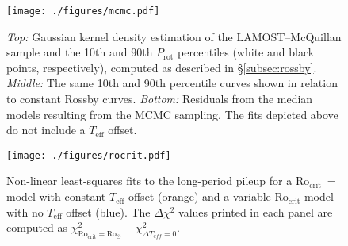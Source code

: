 \documentclass[trackchanges,twocolumn]{aastex631}
\newcommand{\rocrit}{$\mathrm{Ro_{crit}}$\xspace}
\newcommand{\rosun}{$\mathrm{Ro_{\odot}}$\xspace}
\newcommand{\lamostmcq}{LAMOST--McQuillan\xspace}
\newcommand{\teff}{\ensuremath{T_{\mathrm{eff}}}\xspace}
\newcommand{\prot}{\ensuremath{P_\mathrm{rot}}\xspace}
\begin{document}


\begin{figure}
    \centering
    \texttt{[image: ./figures/mcmc.pdf]}
    \caption{\textit{Top:} Gaussian kernel density estimation of the LAMOST--McQuillan sample and the 10th and 90th \prot percentiles (white and black points, respectively), computed as described in \S\ref{subsec:rossby}. \textit{Middle:} The same 10th and 90th percentile curves shown in relation to constant Rossby curves. \textit{Bottom:} Residuals from the median models resulting from the MCMC sampling. The fits depicted above do not include a \teff offset.}
    \label{fig:mcmc}
\end{figure}


\begin{figure*}
    \centering
    \texttt{[image: ./figures/rocrit.pdf]}
    \caption{Non-linear least-squares fits to the long-period pileup for a \rocrit~=~\edit1{\rosun} model with constant \teff offset (orange) and a variable \rocrit model with no \teff offset (blue). The $\Delta \chi^2$ values printed in each panel are computed as $\chi^2_{\text{Ro}_\text{crit}=\text{Ro}_\odot} - \chi^2_{\Delta T_{eff}=0}$.}
    \label{fig:rocrit}
\end{figure*}
\end{document}
